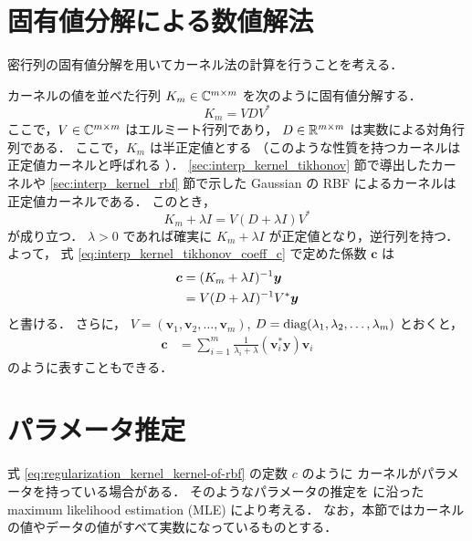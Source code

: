 %

\section{固有値分解による数値解法}\label{sec:interp_kernel_evd-computation}

密行列の固有値分解を用いてカーネル法の計算を行うことを考える．

カーネルの値を並べた行列 $K_m \in \mathbb{C}^{m \times m}$ を次のように固有値分解する．
\begin{equation}
    K_m = V D V^*
\end{equation}
ここで，$V \in \mathbb{C}^{m \times m}$ はエルミート行列であり，
$D \in \mathbb{R}^{m \times m}$ は実数による対角行列である．
ここで，$K_m$ は半正定値とする
（このような性質を持つカーネルは正定値カーネルと呼ばれる \cite{Fukumizu2010}）．
\ref{sec:interp_kernel_tikhonov} 節で導出したカーネルや
\ref{sec:interp_kernel_rbf} 節で示した Gaussian の RBF によるカーネルは
正定値カーネルである．
このとき，
\begin{equation}
    K_m + \lambda I = V (D + \lambda I) V^*
\end{equation}
が成り立つ．
$\lambda > 0$ であれば確実に $K_m + \lambda I$ が正定値となり，逆行列を持つ．
よって，
式 \eqref{eq:interp_kernel_tikhonov_coeff_c} で定めた係数 $\bm{c}$ は
\begin{align}
    \bm{c}
     & = (K_m + \lambda I)^{-1} \bm{y} \notag \\
     & = V (D + \lambda I)^{-1} V^* \bm{y}
\end{align}
と書ける．
さらに，
$V = (\bm{v}_1, \bm{v}_2, \ldots, \bm{v}_m)$,
$D = \operatorname{diag}(\lambda_1, \lambda_2, \ldots, \lambda_m)$
とおくと，
\begin{align}
    \bm{c}
     & = \sum_{i=1}^m \frac{1}{\lambda_i + \lambda} (\bm{v}_i^* \bm{y}) \bm{v}_i
\end{align}
のように表すこともできる．

\section{パラメータ推定}\label{sec:regularization_kernel_param-est}

式 \eqref{eq:regularization_kernel_kernel-of-rbf} の定数 $c$ のように
カーネルがパラメータを持っている場合がある．
そのようなパラメータの推定を
\cite[Remark 3 (Connection to spatial statistics)]{Scheuerer2011}
に沿った
maximum likelihood estimation (MLE)
により考える．
なお，本節ではカーネルの値やデータの値がすべて実数になっているものとする．

